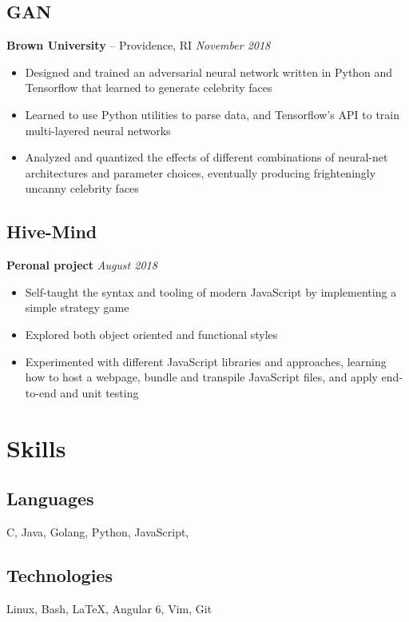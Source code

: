 \documentclass[11pt]{article}
\begin{document}
\subsection{GAN} 
\textbf{Brown University} -- Providence, RI \hfill \textit{November 2018}
\begin{itemize}
	\item Designed and trained an adversarial neural network written in Python and Tensorflow that learned to generate celebrity faces
	\item Learned to use Python utilities to parse data, and Tensorflow's API to train multi-layered neural networks
	\item Analyzed and quantized the effects of different combinations of neural-net architectures and parameter choices, eventually producing frighteningly uncanny celebrity faces
\end{itemize}

\subsection{Hive-Mind} 
\textbf{Peronal project} \hfill \textit{August 2018}
\begin{itemize}
	\item Self-taught the syntax and tooling of modern JavaScript by implementing a simple strategy game 
	\item Explored both object oriented and functional styles 
	\item Experimented with different JavaScript libraries and approaches, learning how to host a webpage, bundle and transpile JavaScript files, and apply end-to-end and unit testing 
\end{itemize}




\section{Skills}
\begin{minipage}{20em}
	\subsection{Languages}
		C, Java, Golang, Python, JavaScript,
\end{minipage}
\begin{minipage}{25em}
	\subsection{Technologies}
	Linux, Bash, \LaTeX , Angular 6, Vim, Git 	
\end{minipage}
\end{document}
